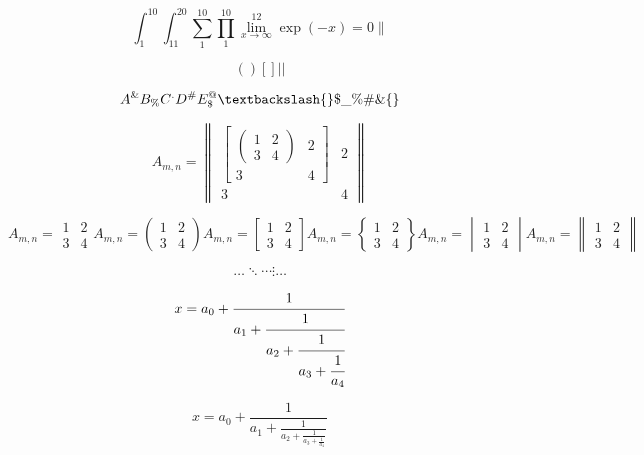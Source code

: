 \documentclass[a4paper,12pt]{article}
\begin{document}
$$ 
\int^{10}_1 \int_{11}^{20} \sum^{10}_{1} \prod_{1}^{10} \lim_{x \to \infty}^{12} \exp(-x) = 0 \|
$$

$$
\left( \right) \left[ \right] \left| \right|
$$

$$
A^\& B_\% C^. D^\# E_\$^@ \textbackslash \lbrace \rbrace \$ \_ \% \# \& \{ \} 
$$

$$
A_{m,n} = \begin{Vmatrix} \begin{bmatrix} \begin{pmatrix} 1 & 2 \\ 3 & 4 \end{pmatrix} & 2 \\ 3 & 4 \end{bmatrix} & 2 \\ 3 & 4 \end{Vmatrix}
$$

$$
A_{m,n} = \begin{matrix} 1 & 2 \\ 3 & 4 \end{matrix}
A_{m,n} = \begin{pmatrix} 1 & 2 \\ 3 & 4 \end{pmatrix}
A_{m,n} = \begin{bmatrix} 1 & 2 \\ 3 & 4 \end{bmatrix}
A_{m,n} = \begin{Bmatrix} 1 & 2 \\ 3 & 4 \end{Bmatrix}
A_{m,n} = \begin{vmatrix} 1 & 2 \\ 3 & 4 \end{vmatrix}
A_{m,n} = \begin{Vmatrix} 1 & 2 \\ 3 & 4 \end{Vmatrix}
$$

$$
\dots \ddots \cdots \vdots \ldots
$$

$$
  x = a_0 + \cfrac{1}{a_1
          + \cfrac{1}{a_2
          + \cfrac{1}{a_3 + \cfrac{1}{a_4} } } }
$$

$$
  x = a_0 + \frac{1}{a_1
          + \frac{1}{a_2
          + \frac{1}{a_3 + \frac{1}{a_4} } } }
$$
\end{document}
